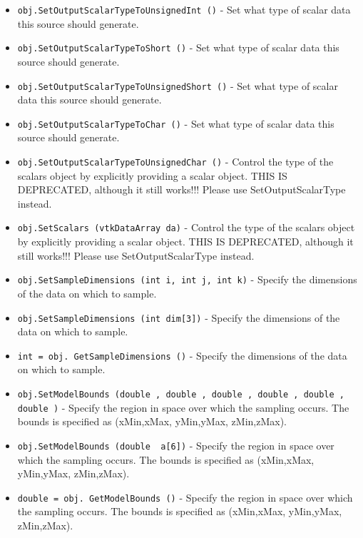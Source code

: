\begin{itemize}
\item  \verb|obj.SetOutputScalarTypeToUnsignedInt ()| -  Set what type of scalar data this source should generate.

\item  \verb|obj.SetOutputScalarTypeToShort ()| -  Set what type of scalar data this source should generate.

\item  \verb|obj.SetOutputScalarTypeToUnsignedShort ()| -  Set what type of scalar data this source should generate.

\item  \verb|obj.SetOutputScalarTypeToChar ()| -  Set what type of scalar data this source should generate.

\item  \verb|obj.SetOutputScalarTypeToUnsignedChar ()| -  Control the type of the scalars object by explicitly providing a scalar
 object.  THIS IS DEPRECATED, although it still works!!! Please use
 SetOutputScalarType instead.

\item  \verb|obj.SetScalars (vtkDataArray da)| -  Control the type of the scalars object by explicitly providing a scalar
 object.  THIS IS DEPRECATED, although it still works!!! Please use
 SetOutputScalarType instead.

\item  \verb|obj.SetSampleDimensions (int i, int j, int k)| -  Specify the dimensions of the data on which to sample.

\item  \verb|obj.SetSampleDimensions (int dim[3])| -  Specify the dimensions of the data on which to sample.

\item  \verb|int = obj. GetSampleDimensions ()| -  Specify the dimensions of the data on which to sample.

\item  \verb|obj.SetModelBounds (double , double , double , double , double , double )| -  Specify the region in space over which the sampling occurs. The
 bounds is specified as (xMin,xMax, yMin,yMax, zMin,zMax).

\item  \verb|obj.SetModelBounds (double  a[6])| -  Specify the region in space over which the sampling occurs. The
 bounds is specified as (xMin,xMax, yMin,yMax, zMin,zMax).

\item  \verb|double = obj. GetModelBounds ()| -  Specify the region in space over which the sampling occurs. The
 bounds is specified as (xMin,xMax, yMin,yMax, zMin,zMax).


\end{itemize}
